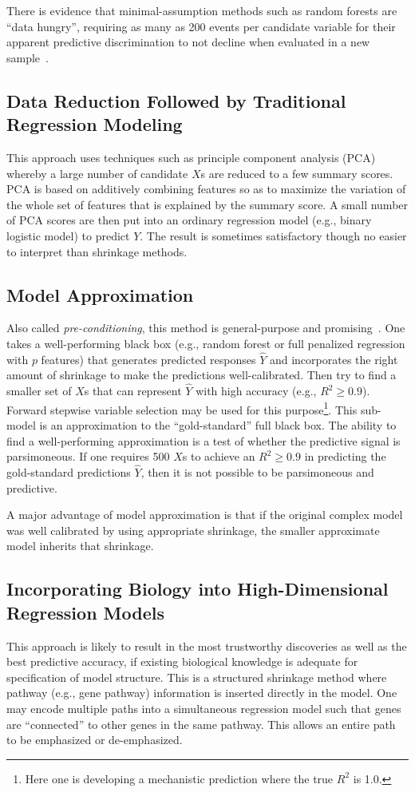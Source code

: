 There is evidence that minimal-assumption methods such as random
forests are ``data hungry'', requiring as many as 200 events per
candidate variable for their apparent predictive discrimination to not
decline when evaluated in a new sample~\cite{plo14mod}.

\subsection{Data Reduction Followed by Traditional Regression Modeling}
This approach uses techniques such as principle component analysis (PCA) whereby a large number of candidate $X$s are reduced to a few summary scores.  PCA is based on additively combining features so as to maximize the variation of the whole set of features that is explained by the summary score.  A small number of PCA scores are then put into an ordinary regression model (e.g., binary logistic model) to predict $Y$.  The result is sometimes satisfactory though no easier to interpret than shrinkage methods.

\subsection{Model Approximation}
Also called \emph{pre-conditioning}, this method is general-purpose and promising~\cite{pau08pre,she04inf,amb02sim}.  One takes a well-performing black box (e.g., random forest or full penalized regression with $p$ features) that generates predicted responses $\hat{Y}$ and incorporates the right amount of shrinkage to make the predictions well-calibrated.  Then try to find a smaller set of $X$s that can represent $\hat{Y}$ with high accuracy (e.g., $R^{2} \geq 0.9$).  Forward stepwise variable selection may be used for this purpose\footnote{Here one is developing a mechanistic prediction where the true $R^{2}$ is 1.0.}. This sub-model is an approximation to the ``gold-standard'' full black box.  The ability to find a well-performing approximation is a test of whether the predictive signal is parsimoneous.  If one requires 500 $X$s to achieve an $R^{2} \geq 0.9$ in predicting the gold-standard predictions $\hat{Y}$, then it is not possible to be parsimoneous and predictive.

A major advantage of model approximation is that if the original complex model was well calibrated by using appropriate shrinkage, the smaller approximate model inherits that shrinkage.

\subsection{Incorporating Biology into High-Dimensional Regression Models}
This approach is likely to result in the most trustworthy discoveries as well as the best predictive accuracy, if existing biological knowledge is adequate for specification of model structure.  This is a structured shrinkage method where pathway (e.g., gene pathway) information is inserted directly in the model.  One may encode multiple paths into a simultaneous regression model such that genes are ``connected'' to other genes in the same pathway.  This allows an
  entire path to be emphasized or de-emphasized.

